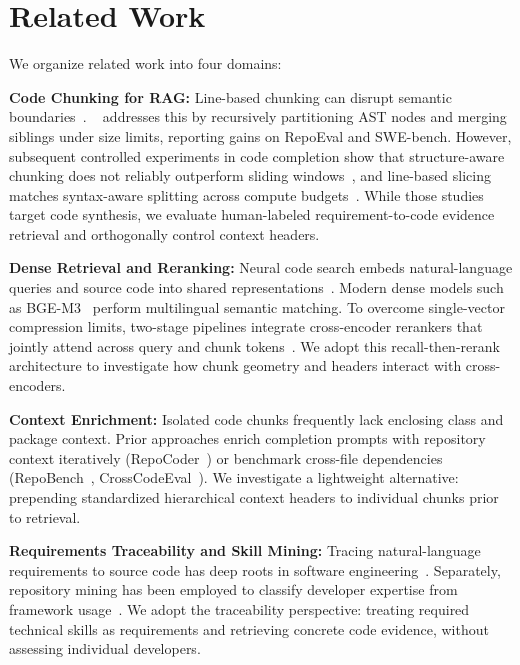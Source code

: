 \section{Related Work}
\label{sec:related_work}

We organize related work into four domains:

\textbf{Code Chunking for RAG:} Line-based chunking can disrupt semantic boundaries~\cite{zhang2025cast}. \castname~\cite{zhang2025cast} addresses this by recursively partitioning AST nodes and merging siblings under size limits, reporting gains on RepoEval and SWE-bench. However, subsequent controlled experiments in code completion show that structure-aware chunking does not reliably outperform sliding windows~\cite{wu2026chunking}, and line-based slicing matches syntax-aware splitting across compute budgets~\cite{galimzyanov2025practical}. While those studies target code synthesis, we evaluate human-labeled requirement-to-code evidence retrieval and orthogonally control context headers.

\textbf{Dense Retrieval and Reranking:} Neural code search embeds natural-language queries and source code into shared representations~\cite{feng2020codebert,guo2022unixcoder,husain2019codesearchnet}. Modern dense models such as BGE-M3~\cite{chen2024bgem3} perform multilingual semantic matching. To overcome single-vector compression limits, two-stage pipelines integrate cross-encoder rerankers that jointly attend across query and chunk tokens~\cite{hu2023revisiting,costv2024apsec}. We adopt this recall-then-rerank architecture to investigate how chunk geometry and headers interact with cross-encoders.

\textbf{Context Enrichment:} Isolated code chunks frequently lack enclosing class and package context. Prior approaches enrich completion prompts with repository context iteratively (RepoCoder~\cite{zhang2023repocoder}) or benchmark cross-file dependencies (RepoBench~\cite{liu2024repobench}, CrossCodeEval~\cite{ding2023crosscodeeval}). We investigate a lightweight alternative: prepending standardized hierarchical context headers to individual chunks prior to retrieval.

\textbf{Requirements Traceability and Skill Mining:} Tracing natural-language requirements to source code has deep roots in software engineering~\cite{antoniol2002traceability,gao2024triad,kuang2023analyzing}. Separately, repository mining has been employed to classify developer expertise from framework usage~\cite{montandon2019identifying}. We adopt the traceability perspective: treating required technical skills as requirements and retrieving concrete code evidence, without assessing individual developers.
